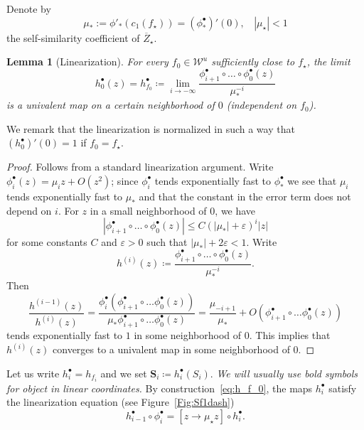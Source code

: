 \documentclass[]{amsart}
\renewcommand{\sp}{{\ \ }}
\newcommand{\bS}{{\mathbf S}}
\newcommand{\str}{{\star}}
\newcommand\WW{\mathcal{W}}
\newtheorem{lem}[thm]{Lemma}
\theoremstyle{remark}
\numberwithin{equation}{section}
\theoremstyle{definition}
\begin{document}
Denote by \[\mu_{*}:= \phi'_{*}(c_1(f_\str))= \left(\phi^{\bullet}_{*}\right)'(0), \sp\sp |\mu_\str |<1\]  the self-similarity coefficient of $\overline Z_\str$.

\begin{lem}[Linearization]
For every $f_0\in \WW^u$ sufficiently close to $f_\str$, the limit 
\begin{equation}
\label{eq:h_f_0}
h^\bullet_{0} (z)=h^\bullet_{f_0}\coloneqq \lim_{i\to - \infty} \frac{\phi^{\bullet}_{i+1}\circ \dots \circ \phi^{\bullet}_{0} (z)}{\mu_*^{-i}}
\end{equation}
is a univalent map on a certain neighborhood of $0$ (independent on $f_0$).
\end{lem}
\noindent We remark that the linearization is normalized in such a way that $(h^\bullet_0)'(0)=1$ if $f_0=f_\str$. 



\begin{proof}
Follows from a standard linearization argument. Write $\phi_{i}^{\bullet}(z)=\mu_iz +O(z^2)$; since $\phi^{\bullet}_{i}$ tends exponentially fast to $\phi^{\bullet}_{*}$ we see that $\mu_i$ tends exponentially fast to $\mu_*$ and that the constant in the error term does not depend on $i$. For $z$ in a small neighborhood of $0$, we have
\[\left|\phi^{\bullet}_{i+1}\circ \dots \circ\phi^{\bullet}_{0} (z)\right|\le C (|\mu_*| +\varepsilon )^i|z|\] for some constants $C$ and $\varepsilon>0$ such that $|\mu_*| +2\varepsilon<1$.
 Write 
\[h^{(i)}(z) \coloneqq  \frac{\phi^{\bullet}_{i+1}\circ \dots \circ \phi^{\bullet}_{0} (z)}{\mu_*^{-i}}.\]
Then
\[\frac{h^{(i-1)}(z)}{h^{(i)}(z)}= \frac{\phi^{\bullet}_{i}\left( \phi^{\bullet}_{i+1}\circ \dots \phi^{\bullet}_{0} (z) \right )}{\mu_*  \phi^{\bullet}_{i+1}\circ \dots \phi^{\bullet}_{0} (z)}= \frac{\mu_{-i+1}}{\mu_*}+O\left(\phi^{\bullet}_{i+1}\circ \dots \phi^{\bullet}_{0} (z) \right)\]
tends exponentially fast to $1$ in some neighborhood of $0$. This implies that $h^{(i)}(z)$ converges to a univalent map in some neighborhood of $0$.
\end{proof}



Let us write $h^\bullet_i=h_{f_i}$ and we set $\bS_i\coloneqq h_i^\bullet (S_i)$. \emph{We will usually use bold symbols for object in linear coordinates.} By construction~\eqref{eq:h_f_0}, the maps $h^\bullet_i$ satisfy the linearization equation (see Figure~\ref{Fig:Sf1dash})
\begin{equation}
\label{eq:hf0:LinEq}
h^{\bullet}_{i-1} \circ \phi_{i}^{\bullet}= [z\to \mu_\str  z] \circ h^{\bullet}_{i}. 
\end{equation}
\end{document}
